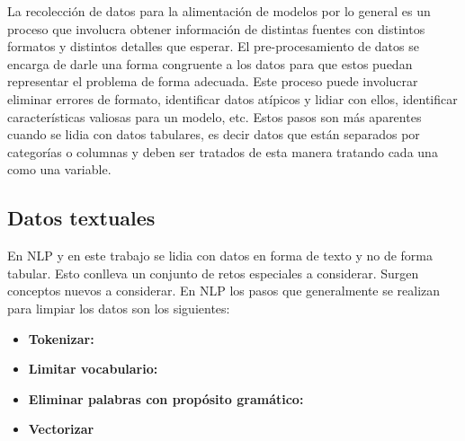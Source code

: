 La recolección de datos para la alimentación de modelos por lo general es un proceso que involucra obtener información de distintas fuentes con distintos formatos y distintos detalles que esperar. El pre-procesamiento de datos se encarga de darle una forma congruente a los datos para que estos puedan representar el problema de forma adecuada. Este proceso puede involucrar eliminar errores de formato, identificar datos atípicos y lidiar con ellos, identificar características valiosas para un modelo, etc. Estos pasos son más aparentes cuando se lidia con datos tabulares, es decir datos que están separados por categorías o columnas y deben ser tratados de esta manera tratando cada una como una variable.

\subsection{Datos textuales}

En NLP y en este trabajo se lidia con datos en forma de texto y no de forma tabular. Esto conlleva un conjunto de retos especiales a considerar. Surgen conceptos nuevos a considerar. En NLP los pasos que generalmente se realizan para limpiar los datos son los siguientes:

\begin{itemize}
\item \textbf{Tokenizar:}
\item \textbf{Limitar vocabulario:}
\item \textbf{Eliminar palabras con propósito gramático:}
\item \textbf{Vectorizar}
\end{itemize}


